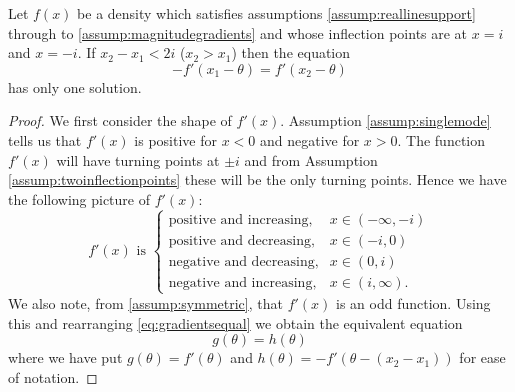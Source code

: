 		\begin{lemma}
			\label{lem:magnitudegradients}
			Let $f(x)$ be a density which satisfies assumptions \ref{assump:reallinesupport} through to \ref{assump:magnitudegradients} and whose inflection points are at $x=i$ and $x=-i$. If 
			$x_2 - x_1 < 2i$ ($x_2 > x_1$) then the equation
			\begin{equation}
				-f'(x_1 - \theta) = f'(x_2 - \theta)
				\label{eq:gradientsequal}
			\end{equation}
			has only one solution.
		\end{lemma}
		\begin{proof}
			We first consider the shape of $f'(x)$. Assumption \ref{assump:singlemode} tells us that $f'(x)$ is positive for $x<0$ and negative for $x>0$. The function $f'(x)$ will have turning points at $\pm i$ and from Assumption \ref{assump:twoinflectionpoints} these will be the only turning points. Hence we have the following picture of $f'(x)$:
			\begin{equation}
				f'(x) \text{ is } 
				\begin{cases}
					\text{positive and increasing,} &x \in (-\infty,-i)\\
					\text{positive and decreasing,} &x \in (-i,0)\\
					\text{negative and decreasing,} &x \in (0,i)\\
					\text{negative and increasing,} &x \in (i,\infty).
				\end{cases}
			\end{equation}
			We also note, from \ref{assump:symmetric}, that $f'(x)$ is an odd function. Using this and rearranging \eqref{eq:gradientsequal} we obtain the equivalent equation
			\begin{equation}
				g(\theta) = h(\theta)
				\label{eq:gradientsequalequivalent}
			\end{equation}
			where we have put $g(\theta) = f'(\theta)$ and $h(\theta) = -f'(\theta - (x_2 - x_1))$ for ease of notation.
			

\end{proof}
